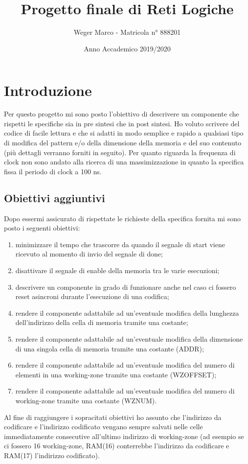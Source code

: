 \documentclass{article}
\begin{document}
\title{Progetto finale di Reti Logiche}
\author{Weger Marco - Matricola n° 888201}
\date{Anno Accademico 2019/2020}
\maketitle

\tableofcontents

\newpage
{}
\section{Introduzione}
Per questo progetto mi sono posto l'obiettivo di descrivere un componente che rispetti le specifiche sia in pre sintesi che in post sintesi.
Ho voluto scrivere del codice di facile lettura e che si adatti in modo semplice e rapido a qualsiasi tipo di modifica del pattern e/o della dimensione della memoria e del suo contenuto (più dettagli verranno forniti in seguito).
Per quanto riguarda la frequenza di clock non sono andato alla ricerca di una massimizzazione in quanto la specifica fissa il periodo di clock a 100 ns.
\subsection{Obiettivi aggiuntivi}
Dopo essermi assicurato di rispettate le richieste della specifica fornita mi sono posto i seguenti obiettivi:
\begin{enumerate}
	\item minimizzare il tempo che trascorre da quando il segnale di start viene ricevuto al momento di invio del segnale di done;
	\item disattivare il segnale di enable della memoria tra le varie esecuzioni;
	\item descrivere un componente in grado di funzionare anche nel caso ci fossero reset asincroni durante l'esecuzione di una codifica;
	\item rendere il componente adattabile ad un'eventuale modifica della lunghezza dell'indirizzo della cella di memoria tramite una costante;
	\item rendere il componente adattabile ad un'eventuale modifica della dimensione di una singola cella di memoria tramite una costante (ADDR);
	\item rendere il componente adattabile ad un'eventuale modifica del numero di elementi in una working-zone tramite una costante (WZ\textunderscore OFFSET);
	\item rendere il componente adattabile ad un'eventuale modifica del numero di working-zone tramite una costante (WZ\textunderscore NUM).
\end{enumerate}
Al fine di raggiungere i sopracitati obiettivi ho assunto che l'indirizzo da codificare e l'indirizzo codificato vengano sempre salvati nelle celle immediatamente consecutive all'ultimo indirizzo di working-zone (ad esempio se ci fossero 16 working-zone, RAM(16) conterrebbe l'indirizzo da codificare e RAM(17) l'indirizzo codificato).
\end{document}
